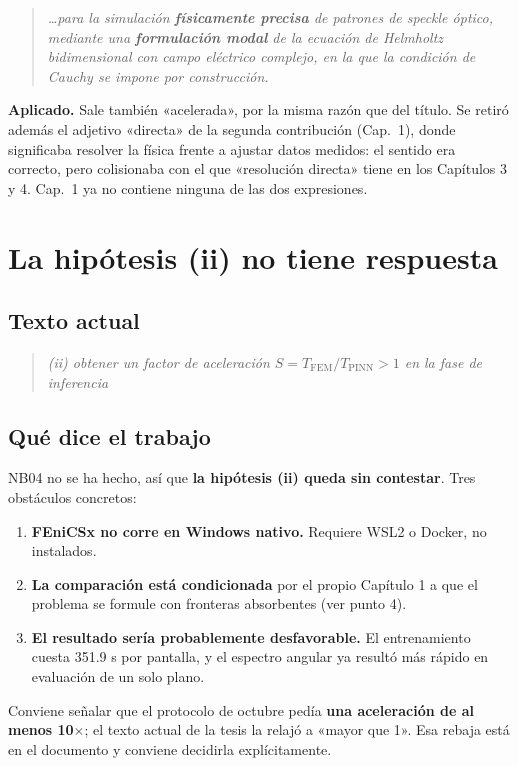 \documentclass[11pt,a4paper]{article}
\renewcommand{\%}{\char`\%\relax}%
\newcommand{\cita}[1]{%
  \begin{quote}\itshape\color{gris}#1\end{quote}}
\begin{document}
\cita{\ldots para la simulación \textbf{físicamente precisa} de patrones de
speckle óptico, mediante una \textbf{formulación modal} de la ecuación de
Helmholtz bidimensional con campo eléctrico complejo, en la que la condición de
Cauchy se impone por construcción.}

\noindent
\textbf{Aplicado.} Sale también «acelerada», por la misma razón que del título.
Se retiró además el adjetivo «directa» de la segunda contribución (Cap.~1), donde
significaba resolver la física frente a ajustar datos medidos: el sentido era
correcto, pero colisionaba con el que «resolución directa» tiene en los
Capítulos 3 y 4. Cap.~1 ya no contiene ninguna de las dos expresiones.

\section{La hipótesis (ii) no tiene respuesta}

\subsection{Texto actual}
\cita{(ii) obtener un factor de aceleración $S = T_{\mathrm{FEM}} /
T_{\mathrm{PINN}} > 1$ en la fase de inferencia}

\subsection{Qué dice el trabajo}
NB04 no se ha hecho, así que \textbf{la hipótesis (ii) queda sin contestar}.
Tres obstáculos concretos:

\begin{enumerate}
  \item \textbf{FEniCSx no corre en Windows nativo.} Requiere WSL2 o Docker, no
  instalados.
  \item \textbf{La comparación está condicionada} por el propio Capítulo 1 a que
  el problema se formule con fronteras absorbentes (ver punto 4).
  \item \textbf{El resultado sería probablemente desfavorable.} El entrenamiento
  cuesta 351.9 s por pantalla, y el espectro angular ya resultó más rápido en
  evaluación de un solo plano.
\end{enumerate}

\noindent
Conviene señalar que el protocolo de octubre pedía \textbf{una aceleración de al
menos 10$\times$}; el texto actual de la tesis la relajó a «mayor que 1». Esa
rebaja está en el documento y conviene decidirla explícitamente.
\end{document}
